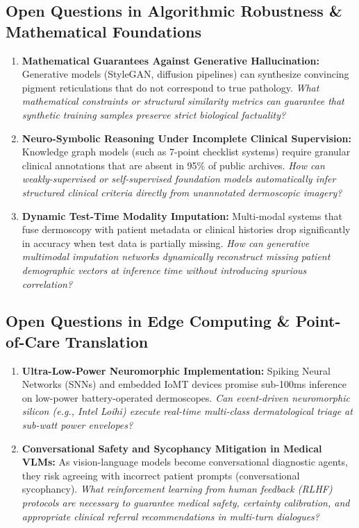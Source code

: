 \subsection{Open Questions in Algorithmic Robustness \& Mathematical Foundations}
\begin{enumerate}[label=\textbf{OQ-\arabic*., resume}, leftmargin=*]
    \item \textbf{Mathematical Guarantees Against Generative Hallucination:} Generative models (StyleGAN, diffusion pipelines) can synthesize convincing pigment reticulations that do not correspond to true pathology. \textit{What mathematical constraints or structural similarity metrics can guarantee that synthetic training samples preserve strict biological factuality?}
    \item \textbf{Neuro-Symbolic Reasoning Under Incomplete Clinical Supervision:} Knowledge graph models (such as 7-point checklist systems) require granular clinical annotations that are absent in 95\% of public archives. \textit{How can weakly-supervised or self-supervised foundation models automatically infer structured clinical criteria directly from unannotated dermoscopic imagery?}
    \item \textbf{Dynamic Test-Time Modality Imputation:} Multi-modal systems that fuse dermoscopy with patient metadata or clinical histories drop significantly in accuracy when test data is partially missing. \textit{How can generative multimodal imputation networks dynamically reconstruct missing patient demographic vectors at inference time without introducing spurious correlation?}
\end{enumerate}

\subsection{Open Questions in Edge Computing \& Point-of-Care Translation}
\begin{enumerate}[label=\textbf{OQ-\arabic*., resume}, leftmargin=*]
    \item \textbf{Ultra-Low-Power Neuromorphic Implementation:} Spiking Neural Networks (SNNs) and embedded IoMT devices promise sub-100ms inference on low-power battery-operated dermoscopes. \textit{Can event-driven neuromorphic silicon (e.g., Intel Loihi) execute real-time multi-class dermatological triage at sub-watt power envelopes?}
    \item \textbf{Conversational Safety and Sycophancy Mitigation in Medical VLMs:} As vision-language models become conversational diagnostic agents, they risk agreeing with incorrect patient prompts (conversational sycophancy). \textit{What reinforcement learning from human feedback (RLHF) protocols are necessary to guarantee medical safety, certainty calibration, and appropriate clinical referral recommendations in multi-turn dialogues?}
\end{enumerate}
